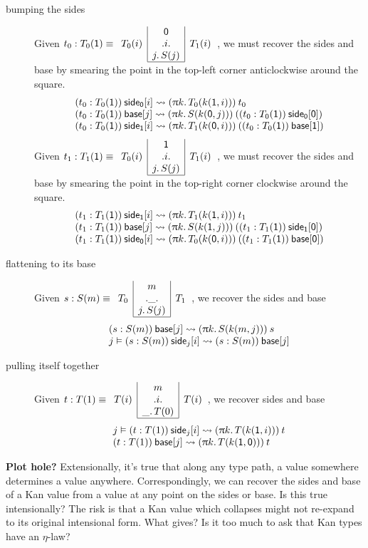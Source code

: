 \documentclass{article}
\newcommand{\pa}[1]{\red{\uppi}#1.\,}
\newcommand{\side}[2]{\:\green{\mathsf{side}_{#1}[}#2\green{]}}
\newcommand{\base}[1]{\:\green{\mathsf{base}[}#1\green{]}}
\newcommand{\ze}{\orange{\mathsf{0}}}
\newcommand{\un}{\orange{\mathsf{1}}}
\newcommand{\mux}[3]{#1\orange{(}#2\orange{,}\,#3\orange{)}}
\newcommand{\KAN}[6]{\blue{\begin{array}{r|c|l}
                        & \black{#6} & \\
                     \black{#2} & \black{.#1.} & \black{#3} \\
                        & \black{#4.\,#5} & \\
                      \cline{2-2}
                     \end{array}}}
\begin{document}
\begin{description}
\item[bumping the sides]
  Given $t_0 : T_0(\un)\equiv \KAN i{T_0(i)}{T_1(i)}j{S(j)}\ze$, we
  must recover the sides and base by smearing the point in the
  top-left corner anticlockwise around the square.
  \[\begin{array}{l}
    (t_0 : T_0(\un))\side\ze i \leadsto
       (\pa k T_0(\mux k\un i))\:t_0 \\
    (t_0 : T_0(\un))\base j \leadsto
       (\pa k S(\mux k\ze j))\:((t_0 : T_0(\un))\side\ze\ze) \\
    (t_0 : T_0(\un))\side\un i \leadsto
       (\pa k T_1(\mux k\ze i))\:((t_0 : T_0(\un))\base\un)
  \end{array}\]
  Given $t_1 : T_1(\un)\equiv \KAN i{T_0(i)}{T_1(i)}j{S(j)}\un$, we
  must recover the sides and base by smearing the point in the
  top-right corner clockwise around the square.
  \[\begin{array}{l}
    (t_1 : T_1(\un))\side\un i \leadsto
       (\pa k T_1(\mux k\un i))\:t_1 \\
    (t_1 : T_1(\un))\base j \leadsto
       (\pa k S(\mux k\un j))\:((t_1 : T_1(\un))\side\un\ze) \\
    (t_1 : T_1(\un))\side\ze i \leadsto
       (\pa k T_0(\mux k\ze i))\:((t_1 : T_1(\un))\base\ze)
  \end{array}\]
\item[flattening to its base]
  Given $s:S(m)\equiv \KAN \_{T_0}{T_1}j{S(j)}m$, we recover the sides
  and base
  \[\begin{array}{l}
    (s:S(m))\base j \leadsto (\pa k S(\mux kmj))\:s \\
    j\vDash (s:S(m))\side ji \leadsto (s:S(m))\base j
  \end{array}\]
\item[pulling itself together]
  Given $t:T(1)\equiv \KAN i{T(i)}{T(i)}\_{T(0)}m$, we recover sides
  and base
  \[\begin{array}{l}
  j\vDash(t:T(1))\side ji \leadsto (\pa k T(\mux k\un i))\:t \\
  (t:T(1))\base j \leadsto (\pa k T(\mux k\un \ze))\:t
  \end{array}\]
\end{description}

\textbf{Plot hole?} Extensionally, it's true that along any type path,
a value somewhere determines a value anywhere. Correspondingly, we can
recover the sides and base of a Kan value from a value at any point on
the sides or base. Is this true intensionally? The risk is that a Kan
value which collapses might not re-expand to its original intensional
form. What gives? Is it too much to ask that Kan types have an
$\eta$-law?
\end{document}
